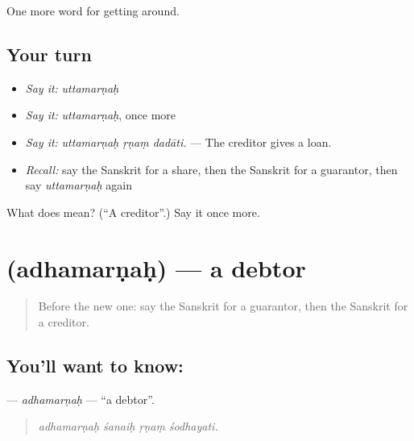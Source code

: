 \begin{grammarlens}[title={What you've built}]
One more word for getting around.
\end{grammarlens}

\subsection*{Your turn}
\begin{itemize}
\raggedright
  \item \emph{Say it:} \emph{uttamarṇaḥ}
  \item \emph{Say it:} \emph{uttamarṇaḥ}, once more
  \item \emph{Say it:} \emph{uttamarṇaḥ ṛṇaṃ dadāti.} — The creditor gives a loan.
  \item \emph{Recall:} say the Sanskrit for a share, then the Sanskrit for a guarantor, then say \emph{uttamarṇaḥ} again
\end{itemize}

\begin{tcolorbox}[breakable,colback=teal!4,colframe=teal!35!black,title={Before you move on}]
What does  mean? (\textquotedblleft{}A creditor\textquotedblright{}.) Say it once more.
\end{tcolorbox}
\section[\texorpdfstring{\sk{अधमर्णः} (adhamarṇaḥ)}{अधमर्णः (adhamarṇaḥ)}]{ (adhamarṇaḥ) — a debtor}

\label{lesson:SA-C434-adhamarnah}



\begin{quote}
Before the new one: say the Sanskrit for a guarantor, then the Sanskrit for a creditor.
\end{quote}

\subsection*{You'll want to know: }
\textbf{} — \emph{adhamarṇaḥ} — \textquotedblleft{}a debtor\textquotedblright{}.

\begin{quote}
   
\end{quote}

\begin{quote}
\emph{adhamarṇaḥ śanaiḥ ṛṇaṃ śodhayati.}
\end{quote}

